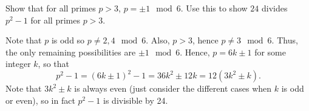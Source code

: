 \documentclass[11pt,dvipsnames]{book}
\numberwithin{equation}{section} %
\numberwithin{figure}{section} %
\numberwithin{table}{section} %
\begin{document}
\begin{exercise} Show that for all primes $p>3$, $p = \pm 1\mod 6$. Use this to show $24$ divides $p^2-1$ for all primes $p>3$.

\begin{solution}
Note that $p$ is odd so $p\not = 2,4\mod 6$. Also, $p>3$, hence $p\neq 3\mod 6$. Thus, the only remaining possibilities are $\pm 1 \mod  6$. Hence, $p=6k\pm 1$ for some integer $k$, so that
\[
p^2-1 = (6k\pm 1)^2-1=36k^2\pm 12k=12(3k^2\pm k).
\]
Note that $3k^2\pm k$ is always even (just consider the different cases when $k$ is odd or even), so in fact $p^2-1$ is divisible by 24. 



\end{solution}

\end{exercise}

%
%
%
%
%
%
%
%
\end{document}
